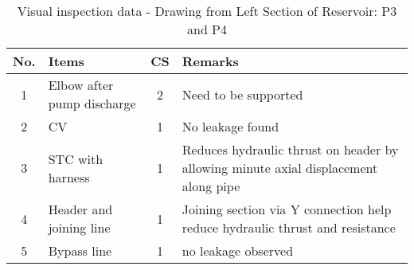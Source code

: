 \begin{table}[!htb]
	\caption{Visual inspection data - Drawing from Left Section of Reservoir: P3 and P4}
	\label{ch043_tbl_visualinspectionP3P4}
		{\scriptsize
\begin{tabular}{c|l|c|p{9cm}}

\hline
No. & Items & CS & Remarks \\ 
\hline
1 & Elbow after pump discharge & 2 & Need to be supported  \\ 
2 & CV & 1 & No leakage found \\ 
3 & STC with harness & 1 & Reduces hydraulic thrust on header by allowing minute axial displacement along pipe \\ 
4 & Header and joining line & 1 & Joining section via Y connection help reduce hydraulic thrust and resistance \\ 
5 & Bypass line & 1 & no leakage observed \\ 
\hline

\end{tabular}
	}
\end{table}